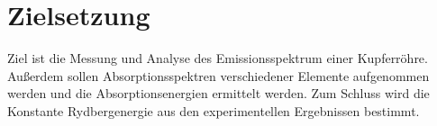 \section{Zielsetzung}
\label{sec:Zielsetzung}
Ziel ist die Messung und Analyse des Emissionsspektrum einer Kupferröhre.
Außerdem sollen Absorptionsspektren verschiedener Elemente aufgenommen werden und die Absorptionsenergien ermittelt werden.
Zum Schluss wird die Konstante Rydbergenergie aus den experimentellen Ergebnissen bestimmt.